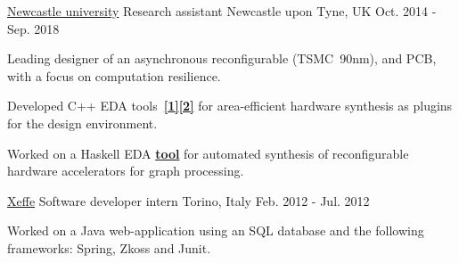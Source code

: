 
\begin{cventries}


\cventry
{\href{https://www.ncl.ac.uk/}{\color{myblue}Newcastle university}}
{Research assistant} %
{Newcastle upon Tyne, UK} %
{Oct. 2014 - Sep. 2018} %
{ 
\begin{cvitems}
\item {Leading designer of an asynchronous reconfigurable
\href{https://ieeexplore.ieee.org/document/8342264/}{}
(TSMC~90nm), and PCB, with a focus on computation resilience.}
\item {Developed C++ EDA
tools~{\color{myblue}\href{https://github.com/tuura/shutters}{\textbf{[1]}}}{\color{myblue}\href{https://github.com/tuura/scenco}{\textbf{[2]}}}
for area-efficient hardware synthesis as plugins for the
\href{https://workcraft.org/}{}
design environment.}
\item {Worked on a Haskell EDA 
{\color{myblue}\href{https://github.com/tuura/fantasi/tree/master/doc}{\textbf{tool}}}
for automated synthesis of reconfigurable hardware accelerators for graph
processing.}
\end{cvitems}
}


\cventry
{\color{myblue}\href{http://www.xeffe.it/}{Xeffe}}
{Software developer intern}
{Torino, Italy}
{Feb. 2012 - Jul. 2012}
{
\begin{cvitems}
Worked on a Java web-application using an SQL database and 
the following frameworks: Spring, Zkoss and Junit.
\end{cvitems}
}


\end{cventries}